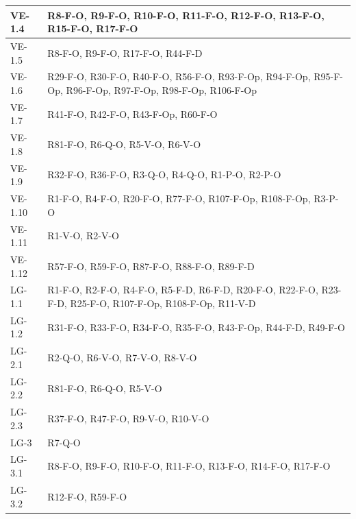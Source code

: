 {\begin{longtable}{|>{\raggedright\arraybackslash}p{3.0cm}|>{\raggedright\arraybackslash}p{12.6cm}|}
    \mbox{VE-1.4} & \mbox{R8-F-O}, \mbox{R9-F-O}, \mbox{R10-F-O}, \mbox{R11-F-O}, \mbox{R12-F-O}, \mbox{R13-F-O}, \mbox{R15-F-O}, \mbox{R17-F-O} \\ \hline
    \mbox{VE-1.5} & \mbox{R8-F-O}, \mbox{R9-F-O}, \mbox{R17-F-O}, \mbox{R44-F-D} \\ \hline
    \mbox{VE-1.6} & \mbox{R29-F-O}, \mbox{R30-F-O}, \mbox{R40-F-O}, \mbox{R56-F-O}, \mbox{R93-F-Op}, \mbox{R94-F-Op}, \mbox{R95-F-Op}, \mbox{R96-F-Op}, \mbox{R97-F-Op}, \mbox{R98-F-Op}, \mbox{R106-F-Op} \\ \hline
    \mbox{VE-1.7} & \mbox{R41-F-O}, \mbox{R42-F-O}, \mbox{R43-F-Op}, \mbox{R60-F-O} \\ \hline
    \mbox{VE-1.8} & \mbox{R81-F-O}, \mbox{R6-Q-O}, \mbox{R5-V-O}, \mbox{R6-V-O} \\ \hline
    \mbox{VE-1.9} & \mbox{R32-F-O}, \mbox{R36-F-O}, \mbox{R3-Q-O}, \mbox{R4-Q-O}, \mbox{R1-P-O}, \mbox{R2-P-O} \\ \hline
    \mbox{VE-1.10} & \mbox{R1-F-O}, \mbox{R4-F-O}, \mbox{R20-F-O}, \mbox{R77-F-O}, \mbox{R107-F-Op}, \mbox{R108-F-Op}, \mbox{R3-P-O} \\ \hline
    \mbox{VE-1.11} & \mbox{R1-V-O}, \mbox{R2-V-O} \\ \hline
    \mbox{VE-1.12} & \mbox{R57-F-O}, \mbox{R59-F-O}, \mbox{R87-F-O}, \mbox{R88-F-O}, \mbox{R89-F-D} \\ \hline
    \mbox{LG-1.1} & \mbox{R1-F-O}, \mbox{R2-F-O}, \mbox{R4-F-O}, \mbox{R5-F-D}, \mbox{R6-F-D}, \mbox{R20-F-O}, \mbox{R22-F-O}, \mbox{R23-F-D}, \mbox{R25-F-O}, \mbox{R107-F-Op}, \mbox{R108-F-Op}, \mbox{R11-V-D} \\ \hline
    \mbox{LG-1.2} & \mbox{R31-F-O}, \mbox{R33-F-O}, \mbox{R34-F-O}, \mbox{R35-F-O}, \mbox{R43-F-Op}, \mbox{R44-F-D}, \mbox{R49-F-O} \\ \hline
    \mbox{LG-2.1} & \mbox{R2-Q-O}, \mbox{R6-V-O}, \mbox{R7-V-O}, \mbox{R8-V-O} \\ \hline
    \mbox{LG-2.2} & \mbox{R81-F-O}, \mbox{R6-Q-O}, \mbox{R5-V-O} \\ \hline
    \mbox{LG-2.3} & \mbox{R37-F-O}, \mbox{R47-F-O}, \mbox{R9-V-O}, \mbox{R10-V-O} \\ \hline
    \mbox{LG-3} & \mbox{R7-Q-O} \\ \hline
    \mbox{LG-3.1} & \mbox{R8-F-O}, \mbox{R9-F-O}, \mbox{R10-F-O}, \mbox{R11-F-O}, \mbox{R13-F-O}, \mbox{R14-F-O}, \mbox{R17-F-O} \\ \hline
    \mbox{LG-3.2} & \mbox{R12-F-O}, \mbox{R59-F-O} \\ \hline

\end{longtable}}
